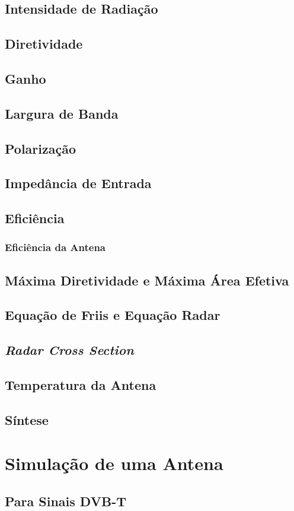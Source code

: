 \subsection*{Intensidade de Radiação}


\subsection*{Diretividade}


\subsection*{Ganho}


\subsection*{Largura de Banda}


\subsection*{Polarização}


\subsection*{Impedância de Entrada}


\subsection*{Eficiência}
\subsubsection*{Eficiência da Antena}


\subsection*{Máxima Diretividade e Máxima Área Efetiva}



\subsection*{Equação de Friis e Equação Radar}



\subsection*{\textit{Radar Cross Section}}



\subsection*{Temperatura da Antena}


\subsection*{Síntese}




\section{Simulação de uma Antena}


\subsection{Para Sinais DVB-T}

